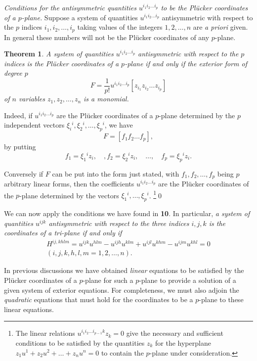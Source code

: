 \documentclass[leqno,11pt]{book}
\numberwithin{equation}{chapter}
\theoremstyle{shape1}
\newtheorem*{thm*}{\hspace{15pt}Theorem}
\theoremstyle{shape0}
\theoremstyle{shape2}
\theoremstyle{definition}
\begin{document}
\vspace{12pt}\fsec \emph{Conditions for the antisymmetric quantities $u^{i_{1}i_{2}\dots i_{p}}$ to be the Pl\"ucker coordinates of a $p$-plane.} Suppose a system of quantities $u^{i_{1}i_{2}\dots i_{p}}$ antisymmetric with respect to the $p$ indices $i_{1},i_{2},\dots,i_{p}$ taking values of the integers $1,2,\dots,n$ are \emph{a priori} given. In general these numbers will not be the Pl\"ucker coordinates of any $p$-plane.
\begin{thm*}
   A system of quantities $u^{i_{1}i_{2}\dots i_{p}}$ antisymmetric with respect to the $p$ indices is the Pl\"ucker coordinates of a $p$-plane if and only if the exterior form of degree $p$
\[
F=\frac{1}{p!}u^{i_{1}i_{2}\dots i_{p}}[z_{i_{1}}z_{i_{2}}\dots z_{i_{p}}]
\]
of $n$ variables $z_{1},z_{2},\dots, z_{n}$ is a monomial.
\end{thm*}
Indeed, if $u^{i_{1}i_{2}\dots i_{p}}$ are the Pl\"ucker coordinates of a $p$-plane determined by the $p$ independent vectors $\xi_{i}{}^{i},\xi_{2}{}^{i},\dots,\xi_{p}{}^{i}$, we have
\[
F=[f_{1}f_{2}\dots f_{p}],
\]
by putting
\[
f_{1}=\xi_{1}{}^{i}z_{i},\quad,f_{2}=\xi_{2}{}^{i}z_{i},\quad\dots,\quad f_{p}=\xi_{p}{}^{i}z_{i}.
\]

Conversely if $F$ can be put into the form just stated, with $f_{1},f_{2},\dots,f_{p}$ being $p$ arbitrary linear forms, then the coefficients $u^{i_{1}i_{2}\dots i_{p}}$ are the Pl\"ucker coordinates of the $p$-plane determined by the vectors $\xi_{1}{}^{i},\dots,\xi_{p}{}^{i}$. \footnote{The linear relations $u^{i_{1}i_{2}\dots i_{p-1}k}z_{k}=0$ give the necessary and sufficient conditions to be satisfied by the quantities $z_{k}$ for the hyperplane $z_{1}u^{1}+z_{2}u^{2}+\dots+z_{n}u^{n}=0$ to contain the $p$-plane under consideration.}\qed

We can now apply the conditions we have found in \textsection
\textbf{10}. In particular, \emph{a system of quantities $u^{ijk}$ antisymmetric with respect to the three indices $i,j,k$ is the coordinates of a tri-plane if and only if}
\begin{gather*}
H^{ij,khlm}=u^{ijk}u^{hlm}-u^{ijh}u^{klm}+u^{ijl}u^{khm}-u^{ijm}u^{khl}=0\\
(i,j,k,h,l,m=1,2,\dots,n).
\end{gather*}

In previous discussions we have obtained  \emph{linear} equations to be satisfied by the Pl\"ucker coordinates of a $p$-plane for such a $p$-plane to provide a solution of a given system of exterior equations. For completeness, we must also adjoin  the \emph{quadratic} equations that must hold for the coordinates to be a $p$-plane to these linear equations.
\end{document}
